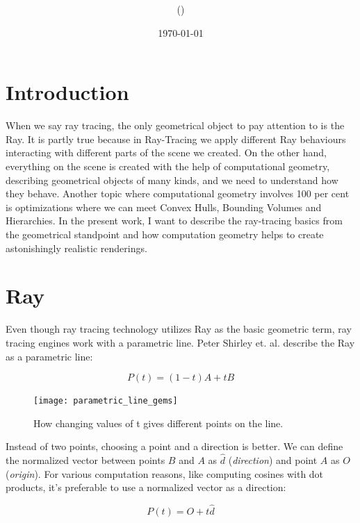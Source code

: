 \documentclass[12pt,a4paper,english]{article}
\title{\mySubject\\\myTitle}
\author{\myName (\myEmail)}
\date{\today}
\begin{document}


\section{Introduction}

When we say ray tracing, the only geometrical object to pay attention to is the Ray. It is partly true because in Ray-Tracing we apply different Ray behaviours interacting with different parts of the scene we created. On the other hand, everything on the scene is created with the help of computational geometry, describing geometrical objects of many kinds, and we need to understand how they behave. Another topic where computational geometry involves 100 per cent is optimizations where we can meet Convex Hulls, Bounding Volumes and Hierarchies. In the present work, I want to describe the ray-tracing basics from the geometrical standpoint and how computation geometry helps to create astonishingly realistic renderings.

\section{Ray}

Even though ray tracing technology utilizes Ray as the basic geometric term, ray tracing engines work with a parametric line. Peter Shirley et. al. describe \cite{Haines_Akenine-Möller_2019} the Ray as a parametric line:

\begin{equation}
    P(t) = (1 - t) A + t B
\end{equation}

\begin{figure}[H]
    \centering
    \texttt{[image: parametric\_line\_gems]}
    \caption[]{How changing values of t gives different points on the line.}
    \label{fig:parametric_line_gems}
\end{figure}

Instead of two points, choosing a point and a direction is better. We can define the normalized vector between points \textbf{$B$} and \textbf{$A$} as \textbf{$\hat{d}$} (\textit{direction}) and point \textbf{$A$} as \textbf{$O$} (\textit{origin}). For various computation reasons, like computing cosines with dot products, it's preferable to use a normalized vector as a direction:

\begin{equation}
    P(t) = O + t \hat{d}
\end{equation}
\end{document}
